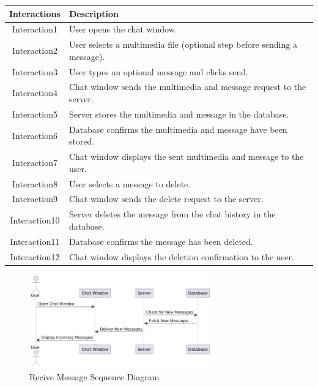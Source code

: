 \begin{longtable}{|c|p{10cm}|}
    \hline
    \textbf{Interactions} & \textbf{Description} \\
    \hline
    Interaction1 & User opens the chat window. \\
    \hline
    Interaction2 & User selects a multimedia file (optional step before sending a message). \\
    \hline
    Interaction3 & User types an optional message and clicks send. \\
    \hline
    Interaction4 & Chat window sends the multimedia and message request to the server. \\
    \hline
    Interaction5 & Server stores the multimedia and message in the database. \\
    \hline
    Interaction6 & Database confirms the multimedia and message have been stored. \\
    \hline
    Interaction7 & Chat window displays the sent multimedia and message to the user. \\
    \hline
    Interaction8 & User selects a message to delete. \\
    \hline
    Interaction9 & Chat window sends the delete request to the server. \\
    \hline
    Interaction10 & Server deletes the message from the chat history in the database. \\
    \hline
    Interaction11 & Database confirms the message has been deleted. \\
    \hline
    Interaction12 & Chat window displays the deletion confirmation to the user. \\
    \hline
\end{longtable}
\newpage
\begin{figure}[h]
    \centering
    \includegraphics[width=0.7\textwidth]{images/recive_message.png} %
    \caption{Recive Message Sequence Diagram}
    \label{fig:example}
\end{figure}


